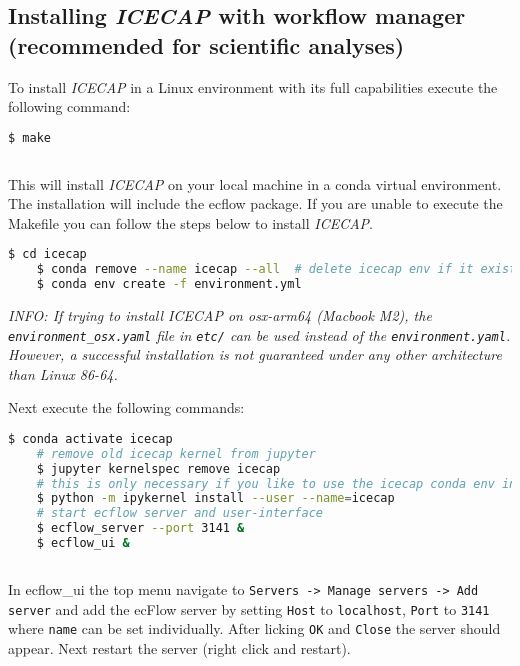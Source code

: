 \documentclass[DIV=10, parskip=full]{scrreprt}
\newcommand{\ice}{\textit{ICECAP}\xspace}
\newcommand{\info}[1]{\textit{INFO: #1}}
\begin{document}
\subsection{Installing \ice with workflow manager (recommended for scientific analyses)}
To install \ice in a Linux environment with its full capabilities execute the following command:
\begin{lstlisting}[language=bash]
	$ make
	
\end{lstlisting}

This will install \ice  on your local machine in a conda virtual environment. The installation will include the ecflow package. If you are unable to execute the Makefile you can follow the steps below to install \ice. \\

\begin{lstlisting}[language=bash]
	$ cd icecap
	$ conda remove --name icecap --all  # delete icecap env if it exists
	$ conda env create -f environment.yml 
\end{lstlisting}

\info{If trying to install \ice on osx-arm64 (Macbook M2), the \texttt{environment\_osx.yaml} file in \texttt{etc/} can be used instead of the  \texttt{environment.yaml}. However, a successful installation is not guaranteed under any other architecture than Linux 86-64.}

Next execute the following commands:\\

\begin{lstlisting}[language=bash]
	$ conda activate icecap
	# remove old icecap kernel from jupyter
	$ jupyter kernelspec remove icecap
	# this is only necessary if you like to use the icecap conda env in jupyter-lab
	$ python -m ipykernel install --user --name=icecap
	# start ecflow server and user-interface
	$ ecflow_server --port 3141 &
	$ ecflow_ui & 
	
\end{lstlisting}

	

In ecflow\_ui the top menu navigate to \texttt{Servers -> Manage servers -> Add server} and add the ecFlow server by setting \texttt{Host} to \texttt{localhost}, \texttt{Port} to \texttt{3141} where \texttt{name} can be set individually. After licking \texttt{OK} and \texttt{Close} the server should appear. Next restart the server (right click and restart).\\
\end{document}
